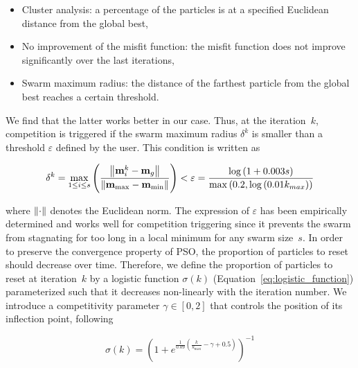 \begin{itemize}
	\item Cluster analysis: a percentage of the particles is at a specified Euclidean distance from the global best,
	\item No improvement of the misfit function: the misfit function does not improve significantly over the last iterations,
	\item Swarm maximum radius: the distance of the farthest particle from the global best reaches a certain threshold.
\end{itemize}

\noindent We find that the latter works better in our case. Thus, at the iteration~$k$, competition is triggered if the swarm maximum radius $\delta^{k}$ is smaller than a threshold $\varepsilon$ defined by the user. This condition is written as

\begin{equation}
	\delta^{k} = \max_{1 \le i \le s} \left( \frac{\left\lVert\mathbf{m}_{i}^{k} - \mathbf{m}_{g}\right\rVert}{\left\lVert\mathbf{m}_{\max} - \mathbf{m}_{\min}\right\rVert} \right) < \varepsilon = \frac{\log \left( 1 + 0.003 s \right)}{\max \left( 0.2, \log \left( 0.01 k_{max} \right) \right)}
	\label{eq:swarm_maximum_radius}
\end{equation}

\noindent where $\left\lVert\cdot\right\rVert$ denotes the Euclidean norm. The expression of $\varepsilon$ has been empirically determined and works well for competition triggering since it prevents the swarm from stagnating for too long in a local minimum for any swarm size~$s$. In order to preserve the convergence property of PSO, the proportion of particles to reset should decrease over time. Therefore, we define the proportion of particles to reset at iteration~$k$ by a logistic function $\sigma \left( k \right)$ (Equation~\ref{eq:logistic_function}) parameterized such that it decreases non-linearly with the iteration number. We introduce a competitivity parameter $\gamma \in \left[ 0, 2 \right]$ that controls the position of its inflection point, following

\begin{equation}
	\sigma \left( k \right) = \left( 1 + e^{\frac{1}{0.09} \left( \frac{k}{k_{\max}} - \gamma + 0.5 \right)} \right)^ {-1}
	\label{eq:logistic_function}
\end{equation}

